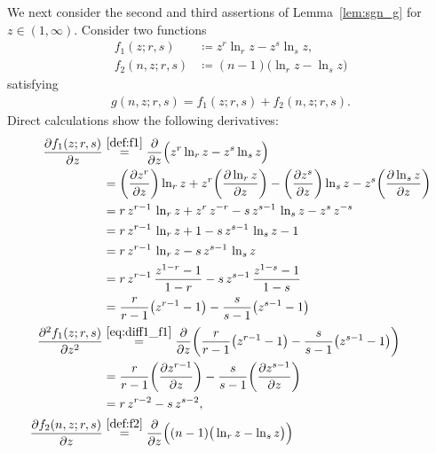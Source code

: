 \documentclass[conference, draftcls, onecolumn]{IEEEtran}
\theoremstyle{plain}
\newcommand{\lemref}[1]{Lemma~\ref{#1}}
\begin{document}
\begin{IEEEproof}[Proof of \lemref{lem:sgn_g}]
We next consider the second and third assertions of \lemref{lem:sgn_g} for $z \in (1, \infty)$.
Consider two functions
\begin{align}
f_{1}(z; r, s)
& \coloneqq
z^{r} \ln_{r} z - z^{s} \ln_{s} z ,
\label{def:f1} \\
f_{2}(n, z; r, s)
& \coloneqq
(n-1) \big( \ln_{r} z - \ln_{s} z \big)
\label{def:f2}
\end{align}
satisfying
\begin{align}
g(n, z; r, s)
=
f_{1}(z; r, s) + f_{2}(n, z; r, s) .
\label{eq:g_f1_f2}
\end{align}
Direct calculations show the following derivatives:
\begin{align}
\frac{ \partial f_{1}(z; r, s) }{ \partial z }
& \overset{\eqref{def:f1}}{=}
\frac{ \partial }{ \partial z } \Big( z^{r} \ln_{r} z - z^{s} \ln_{s} z \Big)
\\
& =
\bigg( \frac{ \partial z^{r} }{ \partial z } \bigg) \ln_{r} z + z^{r} \bigg( \frac{ \partial \ln_{r} z }{ \partial z } \bigg) - \bigg( \frac{ \partial z^{s} }{ \partial z } \bigg) \ln_{s} z - z^{s} \bigg( \frac{ \partial \ln_{s} z }{ \partial z } \bigg)
\\
& =
r \, z^{r-1} \, \ln_{r} z + z^{r} \, z^{-r} - s \, z^{s-1} \, \ln_{s} z - z^{s} \, z^{-s}
\\
& =
r \, z^{r-1} \, \ln_{r} z + 1 - s \, z^{s-1} \, \ln_{s} z - 1
\\
& =
r \, z^{r-1} \, \ln_{r} z - s \, z^{s-1} \, \ln_{s} z
\\
& =
r \, z^{r-1} \, \frac{ z^{1-r} - 1 }{ 1 - r } - s \, z^{s-1} \, \frac{ z^{1-s} - 1 }{ 1 - s }
\\
& =
\frac{ r }{ r-1 } \big( z^{r-1} - 1 \big) - \frac{ s }{ s-1 } \big( z^{s-1} - 1 \big)
\label{eq:diff1_f1} \\
\frac{ \partial^{2} f_{1}(z; r, s) }{ \partial z^{2} }
& \overset{\eqref{eq:diff1_f1}}{=}
\frac{ \partial }{ \partial z } \bigg( \frac{ r }{ r-1 } \big( z^{r-1} - 1 \big) - \frac{ s }{ s-1 } \big( z^{s-1} - 1 \big) \bigg)
\\
& =
\frac{ r }{ r-1 } \bigg( \frac{ \partial z^{r-1} }{ \partial z } \bigg) - \frac{ s }{ s-1 } \bigg( \frac{ \partial z^{s-1} }{ \partial z } \bigg)
\\
& =
r \, z^{r-2} - s \, z^{s-2} ,
\label{eq:diff2_f1} \\
\frac{ \partial f_{2}(n, z; r, s) }{ \partial z }
& \overset{\eqref{def:f2}}{=}
\frac{ \partial }{ \partial z } \Big( (n-1) \big( \ln_{r} z - \ln_{s} z \big) \Big)
\\

\end{align}
\end{IEEEproof}
\end{document}
